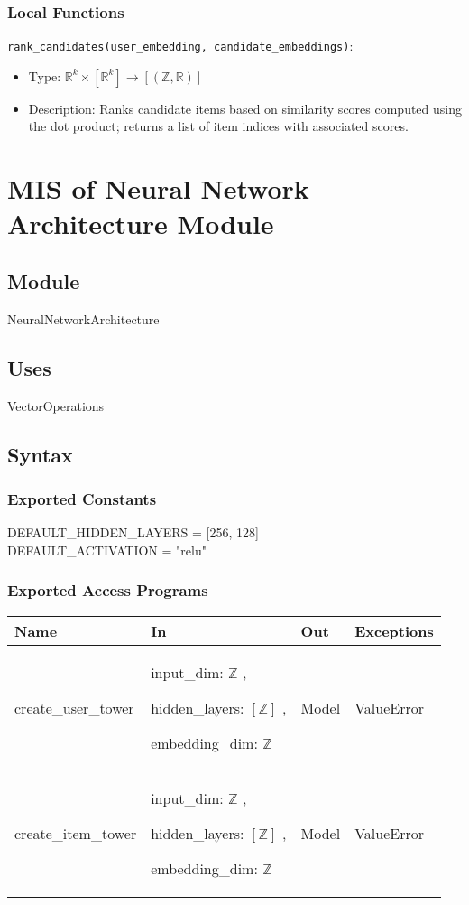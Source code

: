 \documentclass[12pt, titlepage]{article}
\begin{document}
\subsubsection{Local Functions}

\noindent \texttt{rank\_candidates(user\_embedding, candidate\_embeddings)}:
\begin{itemize}
  \item Type: $\mathbb{R}^k \times [\mathbb{R}^k] \rightarrow [(\mathbb{Z}, \mathbb{R})]$
  \item Description: Ranks candidate items based on similarity scores computed using the dot product; returns a list of item indices with associated scores.
\end{itemize}


\newpage

\section{MIS of Neural Network Architecture Module} \label{ModuleNNA}

\subsection{Module}

NeuralNetworkArchitecture

\subsection{Uses}
VectorOperations

\subsection{Syntax}

\subsubsection{Exported Constants}
DEFAULT\_HIDDEN\_LAYERS = [256, 128]\\
DEFAULT\_ACTIVATION = "relu"
\subsubsection{Exported Access Programs}

\begin{center}
  \begin{tabular}{p{4cm} p{4cm} p{4cm} p{2cm}}
  \hline
  \textbf{Name} & \textbf{In} & \textbf{Out} & \textbf{Exceptions} \\
  \hline
  create\_user\_tower & input\_dim: $\mathbb{Z}$ ,
  
  hidden\_layers: $[\mathbb{Z}]$ ,
  
  embedding\_dim: $\mathbb{Z}$ &  Model & ValueError \\
  \hline
  create\_item\_tower & input\_dim: $\mathbb{Z}$ ,
  
  hidden\_layers: $[\mathbb{Z}]$ ,
  
  embedding\_dim: $\mathbb{Z}$ &  Model & ValueError \\
  \hline
  \end{tabular}
  \end{center}
\end{document}
